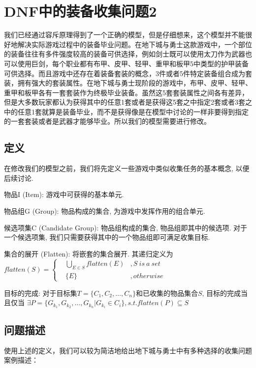 \documentclass[10pt,journal,compsoc]{IEEEtran}
\begin{document}
\section{DNF中的装备收集问题2}
  我们已经通过容斥原理得到了一个正确的模型，但是仔细想来，这个模型并不能很好地解决实际游戏过程中的装备毕业问题。在地下城与勇士这款游戏中，一个部位的装备往往有多件强度较高的装备可供选择，例如剑士既可以使用太刀作为武器也可以使用巨剑，每个职业都有布甲、皮甲、轻甲、重甲和板甲5中类型的护甲装备可供选择。而且游戏中还存在着装备套装的概念，3件或者5件特定装备组合成为套装，拥有强大的套装属性。在地下城与勇士现阶段的游戏中，布甲、皮甲、轻甲、重甲和板甲各有一套套装作为终极毕业装备。虽然这5套套装属性之间各有差异，但是大多数玩家都认为获得其中的任意1套或者是获得这5套之中指定2套或者3套之中的任意1套就算是装备毕业，而不是获得像是在模型中讨论的一样非要得到指定的一套套装或者是武器才能够毕业。所以我们的模型需要进行修改。

  \subsection{定义}

  在修改我们的模型之前，我们将先定义一些游戏中类似收集任务的基本概念, 以便后续讨论. 
  
  物品I (Item): 游戏中可获得的基本单元.

  物品组G (Group): 物品构成的集合, 为游戏中发挥作用的组合单元.
  
  候选项集C (Candidate Group): 物品组构成的集合, 物品组即其中的候选项. 对于一个候选项集, 我们只需要获得其中的一个物品组即可满足收集目标. 
  

  集合的展开 (Flatten): 将嵌套的集合展开. 其递归定义为
  $
  flatten(S) = \left\{
    \begin{aligned}
      & \bigcup\limits_{E \in S} flatten(E) &, S~is~a~set \\
      & \{E\} &, otherwise
    \end{aligned}
  \right.
  $

  目标的完成: 对于目标集$T = \{C_1, C_2, \dots, C_n\}$和已收集的物品集合$S$, 目标的完成当且仅当
  $ \exists P = \{G_{k_1}, G_{k_2}, \dots, G_{k_n} | G_{k_i} \in C_i\}, s.t. flatten(P) \subseteq S$
  
  \vspace{5mm}

  \subsection{问题描述}
  使用上述的定义，我们可以较为简洁地给出地下城与勇士中有多种选择的收集问题案例描述：
  
\end{document}
